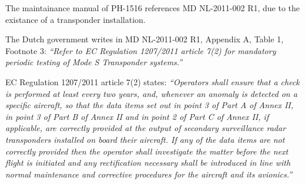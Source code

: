 \documentclass[a4paper]{article}
\begin{document}
The maintainance manual of PH-1516\cite{AMP_PH1516} references MD NL-2011-002 R1, due to the existance of a transponder installation.

The Dutch government writes in MD NL-2011-002 R1\cite{NL_2011_002_R1}, Appendix A, Table 1, Footnote 3: \emph{``Refer to EC Regulation 1207/2011 article 7(2) for mandatory periodic testing of Mode S Transponder systems.''}

EC Regulation 1207/2011\cite{EC_1207_2011} article 7(2) states: \emph{``Operators shall ensure that a check is performed at least every two years, and, whenever an anomaly is detected on a specific aircraft, so that the data items set out in point 3 of Part A of Annex II, in point 3 of Part B of Annex II and in point 2 of Part C of Annex II, if applicable, are correctly provided at the output of secondary surveillance radar transponders installed on board their aircraft. If any of the data items are not correctly provided then the operator shall investigate the matter before the next flight is initiated and any rectification necessary shall be introduced in line with normal maintenance and corrective procedures for the aircraft and its avionics.''}
\end{document}
